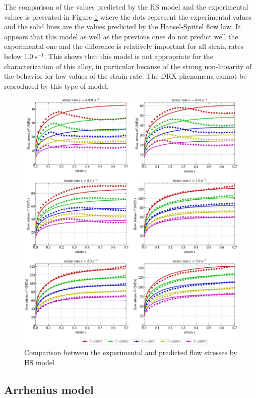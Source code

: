 \documentclass[twoside,english,1p,final,sort&compress]{elsarticle}
\theoremstyle{plain}
\newcommand{\ps}{\text{s}^{-1}}
\begin{document}
The comparison of the values predicted by the HS model and the experimental values is presented in Figure \ref{fig:iCorrelationHS} where the dots represent the experimental values and the solid lines are the values predicted by the Hansel-Spittel flow law.
It appears that this model as well as the previous ones do not predict well the experimental one and the difference is relatively important for all strain rates below $1.0~\ps$.
This shows that this model is not appropriate for the characterization of this alloy, in particular because of the strong non-linearity of the behavior for low values of the strain rate.
The DRX phenomena cannot be reproduced by this type of model.

\begin{figure}[!ht]
\centering
\includegraphics[width=1.02\columnwidth]
{Figures/CompExp-HS-6}
\caption{Comparison between the experimental and predicted flow stresses by HS model}
\label{fig:iCorrelationHS}
\end{figure}

\subsection{Arrhenius model\label{sec:ARmodel}}
\end{document}
